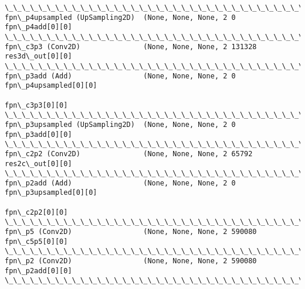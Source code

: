 \documentclass[11pt]{article}
\begin{document}
\begin{Verbatim}[commandchars=\\\{\}]
\_\_\_\_\_\_\_\_\_\_\_\_\_\_\_\_\_\_\_\_\_\_\_\_\_\_\_\_\_\_\_\_\_\_\_\_\_\_\_\_\_\_\_\_\_\_\_\_\_\_\_\_\_\_\_\_\_\_\_\_\_\_\_\_\_\_\_\_\_\_\_\_\_\_\_\_\_\_\_\_\_\_\_\_\_\_\_\_\_\_\_\_\_\_\_\_\_\_
fpn\_p4upsampled (UpSampling2D)  (None, None, None, 2 0           fpn\_p4add[0][0]                  
\_\_\_\_\_\_\_\_\_\_\_\_\_\_\_\_\_\_\_\_\_\_\_\_\_\_\_\_\_\_\_\_\_\_\_\_\_\_\_\_\_\_\_\_\_\_\_\_\_\_\_\_\_\_\_\_\_\_\_\_\_\_\_\_\_\_\_\_\_\_\_\_\_\_\_\_\_\_\_\_\_\_\_\_\_\_\_\_\_\_\_\_\_\_\_\_\_\_
fpn\_c3p3 (Conv2D)               (None, None, None, 2 131328      res3d\_out[0][0]                  
\_\_\_\_\_\_\_\_\_\_\_\_\_\_\_\_\_\_\_\_\_\_\_\_\_\_\_\_\_\_\_\_\_\_\_\_\_\_\_\_\_\_\_\_\_\_\_\_\_\_\_\_\_\_\_\_\_\_\_\_\_\_\_\_\_\_\_\_\_\_\_\_\_\_\_\_\_\_\_\_\_\_\_\_\_\_\_\_\_\_\_\_\_\_\_\_\_\_
fpn\_p3add (Add)                 (None, None, None, 2 0           fpn\_p4upsampled[0][0]            
                                                                 fpn\_c3p3[0][0]                   
\_\_\_\_\_\_\_\_\_\_\_\_\_\_\_\_\_\_\_\_\_\_\_\_\_\_\_\_\_\_\_\_\_\_\_\_\_\_\_\_\_\_\_\_\_\_\_\_\_\_\_\_\_\_\_\_\_\_\_\_\_\_\_\_\_\_\_\_\_\_\_\_\_\_\_\_\_\_\_\_\_\_\_\_\_\_\_\_\_\_\_\_\_\_\_\_\_\_
fpn\_p3upsampled (UpSampling2D)  (None, None, None, 2 0           fpn\_p3add[0][0]                  
\_\_\_\_\_\_\_\_\_\_\_\_\_\_\_\_\_\_\_\_\_\_\_\_\_\_\_\_\_\_\_\_\_\_\_\_\_\_\_\_\_\_\_\_\_\_\_\_\_\_\_\_\_\_\_\_\_\_\_\_\_\_\_\_\_\_\_\_\_\_\_\_\_\_\_\_\_\_\_\_\_\_\_\_\_\_\_\_\_\_\_\_\_\_\_\_\_\_
fpn\_c2p2 (Conv2D)               (None, None, None, 2 65792       res2c\_out[0][0]                  
\_\_\_\_\_\_\_\_\_\_\_\_\_\_\_\_\_\_\_\_\_\_\_\_\_\_\_\_\_\_\_\_\_\_\_\_\_\_\_\_\_\_\_\_\_\_\_\_\_\_\_\_\_\_\_\_\_\_\_\_\_\_\_\_\_\_\_\_\_\_\_\_\_\_\_\_\_\_\_\_\_\_\_\_\_\_\_\_\_\_\_\_\_\_\_\_\_\_
fpn\_p2add (Add)                 (None, None, None, 2 0           fpn\_p3upsampled[0][0]            
                                                                 fpn\_c2p2[0][0]                   
\_\_\_\_\_\_\_\_\_\_\_\_\_\_\_\_\_\_\_\_\_\_\_\_\_\_\_\_\_\_\_\_\_\_\_\_\_\_\_\_\_\_\_\_\_\_\_\_\_\_\_\_\_\_\_\_\_\_\_\_\_\_\_\_\_\_\_\_\_\_\_\_\_\_\_\_\_\_\_\_\_\_\_\_\_\_\_\_\_\_\_\_\_\_\_\_\_\_
fpn\_p5 (Conv2D)                 (None, None, None, 2 590080      fpn\_c5p5[0][0]                   
\_\_\_\_\_\_\_\_\_\_\_\_\_\_\_\_\_\_\_\_\_\_\_\_\_\_\_\_\_\_\_\_\_\_\_\_\_\_\_\_\_\_\_\_\_\_\_\_\_\_\_\_\_\_\_\_\_\_\_\_\_\_\_\_\_\_\_\_\_\_\_\_\_\_\_\_\_\_\_\_\_\_\_\_\_\_\_\_\_\_\_\_\_\_\_\_\_\_
fpn\_p2 (Conv2D)                 (None, None, None, 2 590080      fpn\_p2add[0][0]                  
\_\_\_\_\_\_\_\_\_\_\_\_\_\_\_\_\_\_\_\_\_\_\_\_\_\_\_\_\_\_\_\_\_\_\_\_\_\_\_\_\_\_\_\_\_\_\_\_\_\_\_\_\_\_\_\_\_\_\_\_\_\_\_\_\_\_\_\_\_\_\_\_\_\_\_\_\_\_\_\_\_\_\_\_\_\_\_\_\_\_\_\_\_\_\_\_\_\_

\end{Verbatim}
\end{document}
